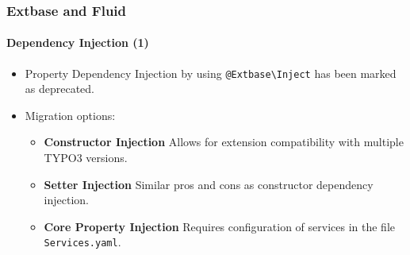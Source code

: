 %

\begin{frame}[fragile]
	\frametitle{Extbase and Fluid}
	\framesubtitle{Dependency Injection (1)}


	\begin{itemize}
		\item Property Dependency Injection by using
			\small\texttt{@Extbase\textbackslash Inject}\normalsize\newline
			has been marked as deprecated.

		\item Migration options:

			\begin{itemize}\small
				\item \textbf{Constructor Injection}\newline
				 	Allows for extension compatibility with multiple TYPO3 versions.
				\item \textbf{Setter Injection}\newline
					Similar pros and cons as constructor dependency injection.
				\item \textbf{Core Property Injection}\newline
					Requires configuration of services in the file \texttt{Services.yaml}.
			\end{itemize}\normalsize

	\end{itemize}

\end{frame}

